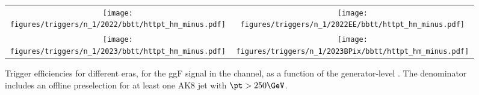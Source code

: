
    \begin{figure}[H]
        \centering
        \begin{tabular}{cc}
            \texttt{[image: figures/triggers/n\_1/2022/bbtt/httpt\_hm\_minus.pdf]} &
            \texttt{[image: figures/triggers/n\_1/2022EE/bbtt/httpt\_hm\_minus.pdf]} \\[1ex]
            \texttt{[image: figures/triggers/n\_1/2023/bbtt/httpt\_hm\_minus.pdf]} &
            \texttt{[image: figures/triggers/n\_1/2023BPix/bbtt/httpt\_hm\_minus.pdf]}
            \label{fig}
        \end{tabular}
\caption{Trigger efficiencies for different eras, for the ggF \HHbbtt signal in the \tauhm channel, as a function of the generator-level \htata \pt. The denominator includes an offline preselection for at least one AK8 jet with $\pt > 250\GeV$.}
\label{fig:triggers_n-1_bbtt_hm_httpt}
\end{figure}
